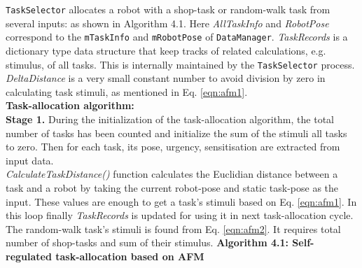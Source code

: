\texttt{TaskSelector}  allocates a robot with a shop-task or random-walk task from several inputs: as shown in Algorithm 4.1. Here  \textit{AllTaskInfo} and \textit{RobotPose} correspond to the \texttt{mTaskInfo} and \texttt{mRobotPose} of \texttt{DataManager}. \textit{TaskRecords} is a dictionary type data structure that keep tracks of related calculations, e.g. stimulus, of all tasks. This is internally maintained by the \texttt{TaskSelector} process.  \textit{DeltaDistance} is a very small constant number to avoid division by zero in calculating task stimuli, as mentioned in Eq. \ref{eqn:afm1}.\\
\textbf{Task-allocation algorithm:}\\
\textbf{Stage 1.} During the initialization of the task-allocation algorithm, the total number of tasks has been counted and initialize the sum of the stimuli all tasks to zero. Then for each task, its pose, urgency, sensitisation are extracted from input data.\\  \textit{CalculateTaskDistance()} function calculates the Euclidian distance between a task and a robot by taking the current robot-pose and static task-pose as the input. These values are enough to get a task's stimuli based on Eq. \ref{eqn:afm1}. In this loop finally  \textit{TaskRecords} is updated for using it in next task-allocation cycle. The random-walk task's stimuli is found from Eq. \ref{eqn:afm2}. It requires total number of shop-tasks and sum of their stimulus.
\newline
\textbf{Algorithm 4.1: Self-regulated task-allocation based on AFM}
\vspace{-3mm}
\newline
\HRule
